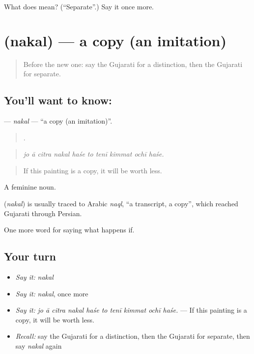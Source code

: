 \begin{tcolorbox}[breakable,colback=teal!4,colframe=teal!35!black,title={Before you move on}]
What does  mean? (\textquotedblleft{}Separate\textquotedblright{}.) Say it once more.
\end{tcolorbox}
\section[\texorpdfstring{\gu{નકલ} (nakal)}{નકલ (nakal)}]{ (nakal) — a copy (an imitation)}

\label{lesson:GU-C544-nakal}



\begin{quote}
Before the new one: say the Gujarati for a distinction, then the Gujarati for separate.
\end{quote}

\subsection*{You'll want to know: }
\textbf{} — \emph{nakal} — \textquotedblleft{}a copy (an imitation)\textquotedblright{}.

\begin{quote}
         .
\end{quote}

\begin{quote}
\emph{jo ā citra nakal haśe to tenī kimmat ochī haśe.}
\end{quote}

\begin{quote}
If this painting is a copy, it will be worth less.
\end{quote}

A feminine noun.

\begin{cousinweb}
\textbf{} (\emph{nakal}) is usually traced to Arabic \emph{naql}, \textquotedblleft{}a transcript, a copy\textquotedblright{}, which reached Gujarati through Persian.
\end{cousinweb}

\begin{grammarlens}[title={What you've built}]
One more word for saying what happens if.
\end{grammarlens}

\subsection*{Your turn}
\begin{itemize}
\raggedright
  \item \emph{Say it:} \emph{nakal}
  \item \emph{Say it:} \emph{nakal}, once more
  \item \emph{Say it:} \emph{jo ā citra nakal haśe to tenī kimmat ochī haśe.} — If this painting is a copy, it will be worth less.
  \item \emph{Recall:} say the Gujarati for a distinction, then the Gujarati for separate, then say \emph{nakal} again
\end{itemize}

